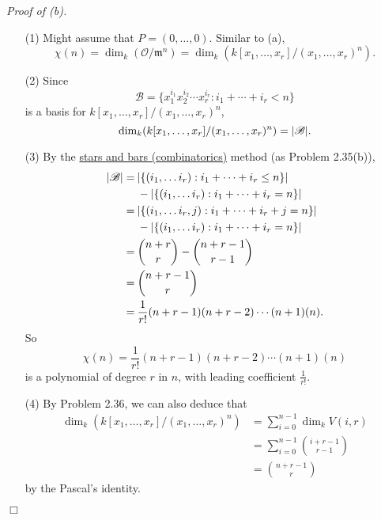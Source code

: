\documentclass{article}
\begin{document}
\emph{Proof of (b).}
\begin{enumerate}
\item[(1)]
  Might assume that $P = (0, \ldots, 0)$.
  Similar to (a),
  \[
    \chi(n)
    = \dim_k(\mathscr{O}/\mathfrak{m}^n)
    = \dim_k(k[x_1,\ldots,x_r]/(x_1,\ldots,x_r)^n).
  \]

\item[(2)]
  Since
  \[
    \mathscr{B}
    = \{ x_1^{i_1} x_2^{i_2} \cdots x_r^{i_r} : i_1 + \cdots + i_r < n \}
  \]
  is a basis for $k[x_1,\ldots,x_r]/(x_1,\ldots,x_r)^n$,
  \[
    \dim_k(k[x_1,\ldots,x_r]/(x_1,\ldots,x_r)^n) = \abs{ \mathscr{B} }.
  \]

\item[(3)]
  By the \href{https://en.wikipedia.org/wiki/Stars_and_bars_%28combinatorics%29}
  {stars and bars (combinatorics)} method (as Problem 2.35(b)),
  \begin{align*}
    \abs{ \mathscr{B} }
    =& \: \abs{ \{ (i_1, \ldots i_r) : i_1 + \cdots + i_r \leq n \} } \\
      & \: - \abs{ \{ (i_1, \ldots i_r) : i_1 + \cdots + i_r = n \} } \\
    =& \: \abs{ \{ (i_1, \ldots i_r, j) : i_1 + \cdots + i_r + j = n \} } \\
      & \: - \abs{ \{ (i_1, \ldots i_r) : i_1 + \cdots + i_r = n \} } \\
    =& \: { n+r \choose r } - { n+r-1 \choose r-1 } \\
    =& \: { n+r-1 \choose r } \\
    =& \: \frac{1}{r!} (n+r-1)(n+r-2) \cdots (n+1)(n).
  \end{align*}
  So
  \[
    \chi(n)
    = \frac{1}{r!} (n+r-1)(n+r-2) \cdots (n+1)(n)
  \]
  is a polynomial of degree $r$ in $n$, with leading coefficient $\frac{1}{r!}$.

\item[(4)]
  By Problem 2.36, we can also deduce that
  \begin{align*}
    \dim_k(k[x_1,\ldots,x_r]/(x_1,\ldots,x_r)^n)
    &= \sum_{i=0}^{n-1} \dim_k V(i,r) \\
    &= \sum_{i=0}^{n-1} { i+r-1 \choose r-1 } \\
    &= { n+r-1 \choose r }
  \end{align*}
  by the Pascal's identity.
\end{enumerate}
$\Box$ \\\\
\end{document}
